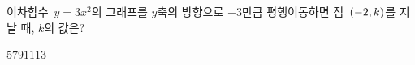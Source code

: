 이차함수~$y=3x^2$의 그래프를 $y$축의 방향으로 $-3$만큼 평행이동하면 점~$(-2{,}\mkern3mu k)$를 지날 때, $k$의 값은?
\begin{choices32}{$5$}{$7$}{$9$}{$11$}{$13$}\end{choices32}
